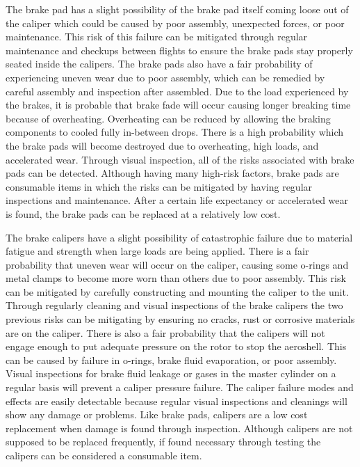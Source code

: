 The brake pad has a slight possibility of the brake pad itself coming loose out of the caliper which could be caused by poor assembly, unexpected forces, or poor maintenance. This risk of this failure can be mitigated through regular maintenance and checkups between flights to ensure the brake pads stay properly seated inside the calipers. The brake pads also have a fair probability of experiencing uneven wear due to poor assembly, which can be remedied by careful assembly and inspection after assembled. Due to the load experienced by the brakes, it is probable that brake fade will occur causing longer breaking time because of overheating. Overheating can be reduced by allowing the braking components to cooled fully in-between drops. There is a high probability which the brake pads will become destroyed due to overheating, high loads, and accelerated wear. Through visual inspection, all of the risks associated with brake pads can be detected. Although having many high-risk factors, brake pads are consumable items in which the risks can be mitigated by having regular inspections and maintenance. After a certain life expectancy or accelerated wear is found, the brake pads can be replaced at a relatively low cost.

The brake calipers have a slight possibility of catastrophic failure due to material fatigue and strength when large loads are being applied.  There is a fair probability that uneven wear will occur on the caliper, causing some o-rings and metal clamps to become more worn than others due to poor assembly. This risk can be mitigated by carefully constructing and mounting the caliper to the unit. Through regularly cleaning and visual inspections of the brake calipers the two previous risks can be mitigating by ensuring no cracks, rust or corrosive materials are on the caliper. There is also a fair probability that the calipers will not engage enough to put adequate pressure on the rotor to stop the aeroshell. This can be caused by failure in o-rings, brake fluid evaporation, or poor assembly. Visual inspections for brake fluid leakage or gases in the master cylinder on a regular basis will prevent a caliper pressure failure. The caliper failure modes and effects are easily detectable because regular visual inspections and cleanings will show any damage or problems. Like brake pads, calipers are a low cost replacement when damage is found through inspection. Although calipers are not supposed to be replaced frequently, if found necessary through testing the calipers can be considered a consumable item.

